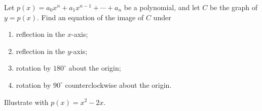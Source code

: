 Let $p(x)=a_0x^n+a_1x^{n-1}+\cdots+a_n$ be a polynomial, and let $C$ be the graph of $y=p(x)$. Find an equation of the image of $C$ under
\begin{enumerate}
\item[(a)] reflection in the $x$-axis;
\item[(b)] reflection in the $y$-axis;
\item[(c)] rotation by $180^\circ$ about the origin;
\item[(d)] rotation by $90^\circ$ counterclockwise about the origin.
\end{enumerate}
Illustrate with $p(x)=x^2-2x$.
